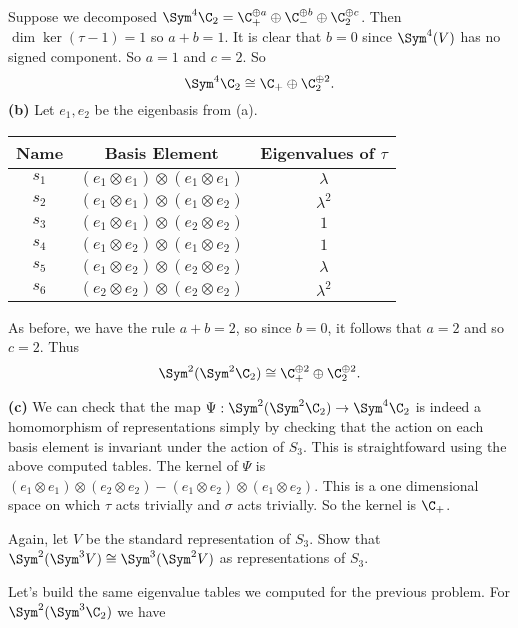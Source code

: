 \documentclass[11pt,letterpaper]{article}
\begin{document}
Suppose we decomposed $\Sym^4\C_2=\C_+^{\oplus a}\oplus \C_-^{\oplus b}\oplus \C_2^{\oplus c}$. Then $\dim \ker(\tau -1)=1$ so $a+b=1$. It is clear that $b=0$ since $\Sym^4(V)$ has no signed component. So $a=1$ and $c=2$. So 
\[
    \Sym^4\C_2\cong \C_+\oplus \C_2^{\oplus 2}
.\] 
\textbf{(b)} Let $e_1, e_2$ be the eigenbasis from (a).
\begin{center}
\begin{tabular}{ |c|c|c| } 
     \hline
     \textbf{Name}& \textbf{Basis Element} & \textbf{Eigenvalues of $\tau$} \\ 
     \hline
     $s_1$&$(e_1\otimes e_1)\otimes (e_1\otimes e_1)$ & $\lambda$ \\ 
     $s_2$&$(e_1\otimes e_1)\otimes (e_1\otimes e_2)$ & $\lambda^2$ \\ 
     $s_3$&$(e_1\otimes e_1)\otimes (e_2\otimes e_2)$ & $1$ \\ 
     $s_4$&$(e_1\otimes e_2)\otimes (e_1\otimes e_2)$ & $1$ \\ 
     $s_5$&$(e_1\otimes e_2)\otimes (e_2\otimes e_2)$ & $\lambda$ \\ 
     $s_6$&$(e_2\otimes e_2)\otimes (e_2\otimes e_2)$ & $\lambda^2$ \\ 
 \hline
\end{tabular}
\end{center}

As before, we have the rule $a+b=2$, so since $b=0$, it follows that $a=2$ and so $c=2$. Thus
\[
    \Sym^2(\Sym^2\C_2)\cong \C_+^{\oplus 2}\oplus \C_2^{\oplus 2}
.\] 

\textbf{(c)} We can check that the map $\Psi : \Sym^2(\Sym^2\C_2) \to \Sym^4\C_2$ is indeed a homomorphism of representations simply by checking that the action on each basis element is invariant under the action of $S_3$. This is straightfoward using the above computed tables. The kernel of $\Psi$ is $(e_1\otimes e_1)\otimes (e_2\otimes e_2) - (e_1\otimes e_2)\otimes (e_1\otimes e_2)$. This is a one dimensional space on which $\tau$ acts trivially and $\sigma$ acts trivially. So the kernel is $\C_+$.

\pagebreak
\begin{problem}
    Again, let $V$ be the standard representation of $S_3$. Show that $\Sym^2(\Sym^3V) \cong \Sym^3(\Sym^2V)$ as representations of $S_3$.
\end{problem}

Let's build the same eigenvalue tables we computed for the previous problem. For $\Sym^2(\Sym^3\C_2)$ we have
\end{document}
